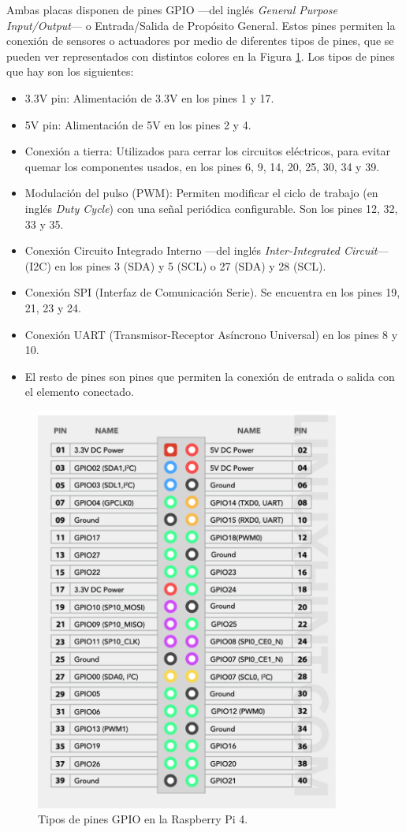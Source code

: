 Ambas placas disponen de pines GPIO ---del inglés \textit{General Purpose Input/Output}--- o Entrada/Salida de Propósito General. Estos pines permiten la conexión de sensores o actuadores por medio de diferentes tipos de pines, que se pueden ver representados con distintos colores en la Figura \ref{fig:pinout}. Los tipos de pines que hay son los siguientes:
\begin{itemize}
\item 3.3V pin: Alimentación de 3.3V en los pines 1 y 17.
\item 5V pin: Alimentación de 5V en los pines 2 y 4.
\item Conexión a tierra: Utilizados para cerrar los circuitos eléctricos, para evitar quemar los componentes usados, en los pines 6, 9, 14, 20, 25, 30, 34 y 39.
\item Modulación del pulso (PWM): Permiten modificar el ciclo de trabajo (en inglés \textit{Duty Cycle}) con una señal periódica configurable. Son los pines 12, 32, 33 y 35.
\item Conexión Circuito Integrado Interno ---del inglés \textit{Inter-Integrated Circuit}--- (I2C) en los pines 3 (SDA) y 5 (SCL) o 27 (SDA) y 28 (SCL).
\item Conexión SPI (Interfaz de Comunicación Serie). Se encuentra en los pines 19, 21, 23 y 24.
\item Conexión UART (Transmisor-Receptor Asíncrono Universal) en los pines 8 y 10.
\item El resto de pines son pines que permiten la conexión de entrada o salida con el elemento conectado.
\end{itemize}

\begin{figure} [h!]
  \begin{center}
    \includegraphics[width=10cm]{figs/pinout}
  \end{center}
  \caption{Tipos de pines GPIO en la Raspberry Pi 4.}
  \label{fig:pinout}
\end{figure}

